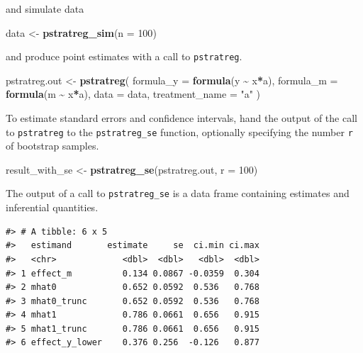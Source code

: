 \documentclass[
]{book}
\newenvironment{Shaded}{\begin{snugshade}}{\end{snugshade}}
\newcommand{\AttributeTok}[1]{\textcolor[rgb]{0.13,0.29,0.53}{#1}}
\newcommand{\DecValTok}[1]{\textcolor[rgb]{0.00,0.00,0.81}{#1}}
\newcommand{\FunctionTok}[1]{\textcolor[rgb]{0.13,0.29,0.53}{\textbf{#1}}}
\newcommand{\NormalTok}[1]{#1}
\newcommand{\OtherTok}[1]{\textcolor[rgb]{0.56,0.35,0.01}{#1}}
\newcommand{\SpecialCharTok}[1]{\textcolor[rgb]{0.81,0.36,0.00}{\textbf{#1}}}
\newcommand{\StringTok}[1]{\textcolor[rgb]{0.31,0.60,0.02}{#1}}
\begin{document}
and simulate data

\begin{Shaded}
\begin{Highlighting}[]
\NormalTok{data }\OtherTok{\textless{}{-}} \FunctionTok{pstratreg\_sim}\NormalTok{(}\AttributeTok{n =} \DecValTok{100}\NormalTok{)}
\end{Highlighting}
\end{Shaded}

and produce point estimates with a call to \texttt{pstratreg}.

\begin{Shaded}
\begin{Highlighting}[]
\NormalTok{pstratreg.out }\OtherTok{\textless{}{-}} \FunctionTok{pstratreg}\NormalTok{(}
  \AttributeTok{formula\_y =} \FunctionTok{formula}\NormalTok{(y }\SpecialCharTok{\textasciitilde{}}\NormalTok{ x}\SpecialCharTok{*}\NormalTok{a),}
  \AttributeTok{formula\_m =} \FunctionTok{formula}\NormalTok{(m }\SpecialCharTok{\textasciitilde{}}\NormalTok{ x}\SpecialCharTok{*}\NormalTok{a),}
  \AttributeTok{data =}\NormalTok{ data,}
  \AttributeTok{treatment\_name =} \StringTok{"a"}
\NormalTok{)}
\end{Highlighting}
\end{Shaded}

To estimate standard errors and confidence intervals, hand the output of the call to \texttt{pstratreg} to the \texttt{pstratreg\_se} function, optionally specifying the number \texttt{r} of bootstrap samples.

\begin{Shaded}
\begin{Highlighting}[]
\NormalTok{result\_with\_se }\OtherTok{\textless{}{-}} \FunctionTok{pstratreg\_se}\NormalTok{(pstratreg.out, }\AttributeTok{r =} \DecValTok{100}\NormalTok{)}
\end{Highlighting}
\end{Shaded}

The output of a call to \texttt{pstratreg\_se} is a data frame containing estimates and inferential quantities.

\begin{verbatim}
#> # A tibble: 6 x 5
#>   estimand       estimate     se  ci.min ci.max
#>   <chr>             <dbl>  <dbl>   <dbl>  <dbl>
#> 1 effect_m          0.134 0.0867 -0.0359  0.304
#> 2 mhat0             0.652 0.0592  0.536   0.768
#> 3 mhat0_trunc       0.652 0.0592  0.536   0.768
#> 4 mhat1             0.786 0.0661  0.656   0.915
#> 5 mhat1_trunc       0.786 0.0661  0.656   0.915
#> 6 effect_y_lower    0.376 0.256  -0.126   0.877
\end{verbatim}
\end{document}
